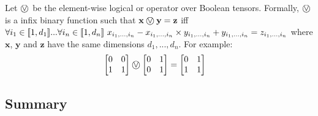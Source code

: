 \begin{definition}
	\label{tensoror}
	
	Let $\incircbin{\lor}$ be the element-wise logical or operator over Boolean tensors. Formally, $\incircbin{\lor}$ is a infix binary function such that $\mathbf{x}\incircbin{\lor}\mathbf{y}=\mathbf{z}$ iff $\forall i_1\in[\![{1,d_1}]\!]...\forall i_n\in[\![{1,d_n}]\!]\ x_{i_1,...,i_n}-x_{i_1,...,i_n}\times y_{i_1,...,i_n}+y_{i_1,...,i_n}=z_{i_1,...,i_n}$ where $\mathbf{x}$, $\mathbf{y}$ and $\mathbf{z}$ have the same dimensions $d_1,...,d_n$.
	\linespace
	For example:
	\begin{align*}
	\begin{bmatrix}
	0&0\\
	1&1\\
	\end{bmatrix}
	\incircbin{\lor}
	\begin{bmatrix}
	0&1\\
	0&1\\
	\end{bmatrix}
	&=
	\begin{bmatrix}
	0&1\\
	1&1\\
	\end{bmatrix}
	\end{align*}
\end{definition}

\subsection{Summary}

